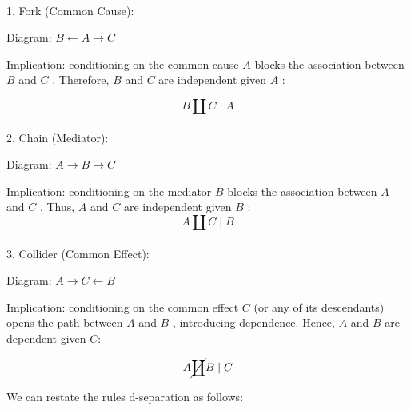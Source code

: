 \documentclass[
  singlecolumn]{article}
\makeatletter
\let\oldparagraph\paragraph
\renewcommand{\paragraph}{
    \@ifstar
      \xxxParagraphStar
      \xxxParagraphNoStar
  }
\newcommand{\xxxParagraphStar}[1]{\oldparagraph*{#1}\mbox{}}
\newcommand{\xxxParagraphNoStar}[1]{\oldparagraph{#1}\mbox{}}
\makeatother
\begin{document}
\paragraph{1. Fork (Common Cause):}\label{fork-common-cause}

Diagram: \(B \leftarrow \boxed{A} \rightarrow C\)

Implication: conditioning on the common cause \(A\) blocks the
association between \(B\) and \(C\) . Therefore, \(B\) and \(C\) are
independent given \(A\) :

\[
 B \coprod C \mid A
 \]

\paragraph{2. Chain (Mediator):}\label{chain-mediator}

Diagram: \(A \rightarrow \boxed{B} \rightarrow C\)

Implication: conditioning on the mediator \(B\) blocks the association
between \(A\) and \(C\) . Thus, \(A\) and \(C\) are independent given
\(B\) : \[
 A \coprod C \mid B
 \]

\paragraph{3. Collider (Common Effect):}\label{collider-common-effect}

Diagram: \(A \rightarrow \boxed{C} \leftarrow B\)

Implication: conditioning on the common effect \(C\) (or any of its
descendants) opens the path between \(A\) and \(B\) , introducing
dependence. Hence, \(A\) and \(B\) are dependent given \(C\):

\[
A \cancel \coprod B \mid C
\]

We can restate the rules d-separation as follows:
\end{document}
